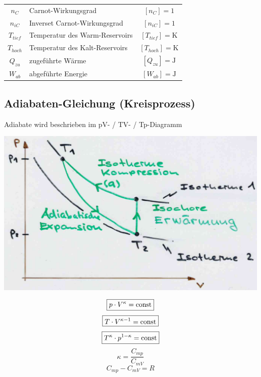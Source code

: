 \begin{tabular}{c l c}
	$n_C$ & Carnot-Wirkungsgrad & $[n_C] = \mathrm{1}$ \\
	$n_{iC}$ & Inverset Carnot-Wirkungsgrad & $[n_{iC}] = \mathrm{1}$ \\
	$T_{tief}$ & Temperatur des Warm-Reservoirs & $[T_{tief}] = \mathrm{K}$ \\
	$T_{hoch}$ & Temperatur des Kalt-Reservoirs & $[T_{hoch}] = \mathrm{K}$  \\
	$Q_{zu}$ & zugeführte Wärme & $[Q_{zu}] = \mathrm{J}$ \\ 
	$W_{ab}$ & abgeführte Energie & $[W_{ab}] = \mathrm{J}$ \\ 
\end{tabular}







\subsection{Adiabaten-Gleichung (Kreisprozess)}
Adiabate wird beschrieben im pV- / TV- / Tp-Diagramm
\\


\begin{minipage}{0.6\linewidth}
\includegraphics[width=\linewidth]{Bilder/kreisprozess}
\end{minipage}
\hfill
\begin{minipage}{0.38\linewidth}
$$ \boxed{ p \cdot V^\kappa  = \mathrm{const} } $$
$$ \boxed{ T \cdot V^{\kappa -1} = \mathrm{const} } $$
$$ \boxed{ T^\kappa \cdot p^{1-\kappa} = \mathrm{const} } $$
$$ \kappa = \frac{C_{mp}}{C_{mV}}$$
$$ \boxed{ C_{mp} - C_{mV} = R }$$
\\
\end{minipage}




